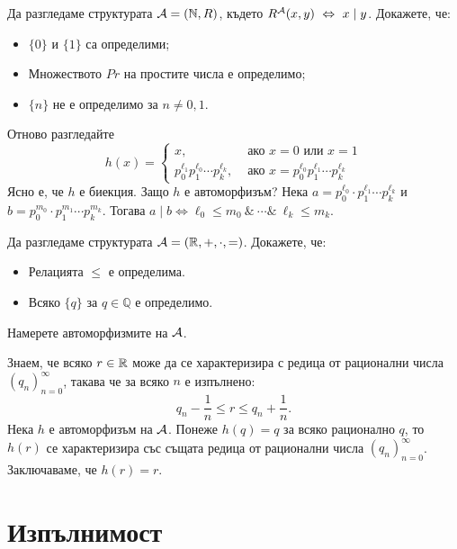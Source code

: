 \begin{problem}
  Да разгледаме структурата $\mathcal{A} = (\mathbb{N}, R)$, където $R^{\mathcal{A}}(x,y) \ \Leftrightarrow\  x \mid y$.
  Докажете, че:
  \begin{itemize}
  \item
    $\{0\}$ и $\{1\}$ са определими;
  \item
    Множеството $Pr$ на простите числа е определимо;
  \item
    $\{n\}$ не е определимо за $n \neq 0,1$.
  \end{itemize}
\end{problem}
\begin{hint}
  Отново разгледайте
  \[h(x) =
    \begin{cases}
      x, & \text{ ако }x = 0 \text{ или } x = 1\\
      p^{\ell_1}_0p^{\ell_0}_1\cdots p^{\ell_k}_k, & \text{ ако }x = p^{\ell_0}_0 p^{\ell_1}_1 \cdots p^{\ell_k}_k
    \end{cases}\]
  Ясно е, че $h$ е биекция. Защо $h$ е автоморфизъм?
  Нека $a = p^{\ell_0}_0 \cdot p^{\ell_1}_1 \cdots p^{\ell_k}_k$ и $b = p^{m_0}_0 \cdot p^{m_1}_1 \cdots p^{m_k}_k$. Тогава
  $a \mid b \iff \ell_0 \leq m_0\ \&\ \cdots \&\ \ell_k \leq m_k$.
\end{hint}

\begin{problem}
  Да разгледаме структурата $\mathcal{A} = (\mathbb{R}, +, \cdot, =)$.
  Докажете, че:
  \begin{itemize}
  \item
    Релацията $\leq$ е определима.
  \item
    Всяко $\{q\}$ за $q \in \mathbb{Q}$ е определимо.
  \end{itemize}
  Намерете автоморфизмите на $\mathcal{A}$.
\end{problem}
\begin{hint}
  Знаем, че всяко $r \in \mathbb{R}$ може да се характеризира с редица от рационални числа $(q_n)^\infty_{n=0}$, такава че
  за всяко $n$ е изпълнено:
  \[ q_n - \frac{1}{n} \leq r \leq q_n + \frac{1}{n}.\]
  Нека $h$ е автоморфизъм на $\mathcal{A}$. Понеже $h(q) = q$ за всяко рационално $q$, то
  $h(r)$ се характеризира със същата редица от рационални числа $(q_n)^{\infty}_{n=0}$.
  Заключаваме, че $h(r) = r$.
\end{hint}



\section{Изпълнимост}


